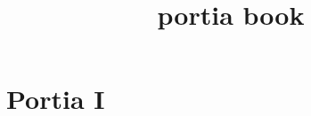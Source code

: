 \documentclass{article}
\title{portia book}
\date{}
\begin{document}
\maketitle

\section{Portia I}


\end{document}
